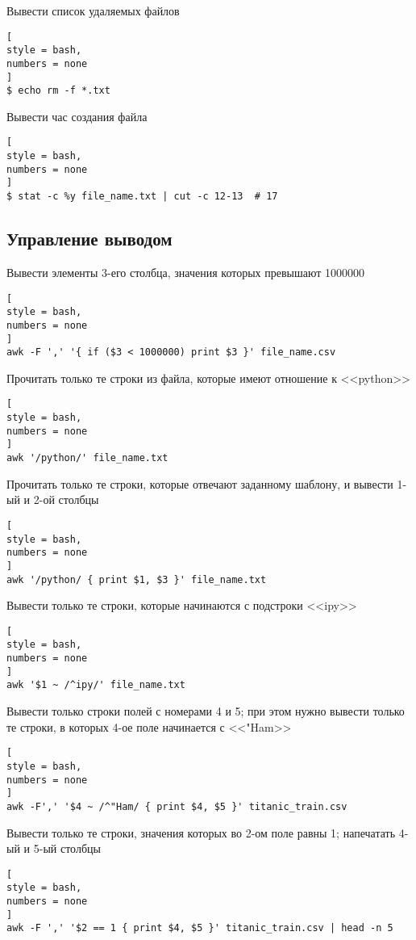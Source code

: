 \documentclass[%
	11pt,
	a4paper,
	utf8,
		]{article}
\begin{document}
Вывести список удаляемых файлов
\begin{lstlisting}[
style = bash,
numbers = none
]
$ echo rm -f *.txt
\end{lstlisting}

Вывести час создания файла
\begin{lstlisting}[
style = bash,
numbers = none
]
$ stat -c %y file_name.txt | cut -c 12-13  # 17
\end{lstlisting}

\subsection{Управление выводом}

Вывести элементы 3-его столбца, значения которых превышают 1000000
\begin{lstlisting}[
style = bash,
numbers = none
]
awk -F ',' '{ if ($3 < 1000000) print $3 }' file_name.csv
\end{lstlisting}

Прочитать только те строки из файла, которые имеют отношение к <<python>>
\begin{lstlisting}[
style = bash,
numbers = none
]
awk '/python/' file_name.txt
\end{lstlisting}

Прочитать только те строки, которые отвечают заданному шаблону, и вывести 1-ый и 2-ой столбцы
\begin{lstlisting}[
style = bash,
numbers = none
]
awk '/python/ { print $1, $3 }' file_name.txt
\end{lstlisting}

Вывести только те строки, которые начинаются с подстроки <<ipy>>
\begin{lstlisting}[
style = bash,
numbers = none
]
awk '$1 ~ /^ipy/' file_name.txt
\end{lstlisting}

Вывести только строки полей с номерами 4 и 5; при этом нужно вывести только те строки, в которых 4-ое поле начинается с <<"Ham>>
\begin{lstlisting}[
style = bash,
numbers = none
]
awk -F',' '$4 ~ /^"Ham/ { print $4, $5 }' titanic_train.csv
\end{lstlisting}

Вывести только те строки, значения которых во 2-ом поле равны 1; напечатать 4-ый и 5-ый столбцы
\begin{lstlisting}[
style = bash,
numbers = none
]
awk -F ',' '$2 == 1 { print $4, $5 }' titanic_train.csv | head -n 5
\end{lstlisting}
\end{document}
